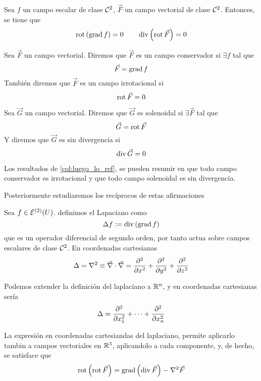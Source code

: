 \begin{col}[T.Schwarz]\label{col:luego_lo_ref}
    Sea $f$ un campo escalar de clase $\C^2$, $\vec{F}$ un campo vectorial de clase $\C^2$. Entonces, se tiene que
    \[
        \rot\left( \grad f \right) = 0 \qquad \diver \left( \rot \vec{F} \right) = 0
    \]
\end{col}

\begin{defi}
    Sea $\vec{F}$ un campo vectorial. Diremos que $\vec{F}$ es un campo conservador si $\exists f$ tal que
    \[
        \vec{F} = \grad f
    \]
    Tambi\'en diremos que $\vec{F}$ es un campo irrotacional si
    \[
        \rot \vec{F} = 0
    \]
\end{defi}
\begin{defi}
    Sea $\vec{G}$ un campo vectorial. Diremos que $\vec{G}$ es solenoidal si $\exists \vec{F}$ tal que
    \[
        \vec{G} = \rot \vec{F}
    \]
    Y diremos que $\vec{G}$ es sin divergencia si
    \[
        \diver \vec{G} = 0
    \]
\end{defi}

\begin{obs}
    Los resultados de \ref{col:luego_lo_ref}, se pueden resumir en que todo campo conservador es irrotacional y que todo
    campo solenoidal es sin divergencia.

    Posteriormente estudiaremos los recíprocos de estas afirmaciones
\end{obs}

\begin{defi}
    Sea $f \in \Es^{(2)}(U)$. definimos el Lapaciano como
    \[
        \Delta f := \diver \left( \grad f \right)
    \]
    que es un operador diferencial de segundo orden, por tanto actua sobre campos escalares de clase $\C^2$. En
    coordenadas cartesianas
    \[
        \Delta = \nabla^2 \equiv \vec{\nabla} \cdot \vec{\nabla} = \pdv[2]{}{x} + \pdv[2]{}{y} + \pdv[2]{}{z}
    \]
\end{defi}

\begin{obs*}
    Podemos extender la definición del laplaciano a $\real^n$, y en coordenadas cartesianas sería
    \[
        \Delta = \pdv[2]{}{x_1} + \cdots + \pdv[2]{}{x_n}
    \]
\end{obs*}

\begin{obs}
    La expresión en coordenadas cartesiandas del laplaciano, permite aplicarlo tambin a campos vectoriales en
    $\real^3$, aplicandolo a cada componente, y, de hecho, se satisface que
    \[
        \rot \left( \rot \vec{F} \right) = \grad \left( \diver \vec{F} \right) - \nabla^2\vec{F}
    \]
\end{obs}

